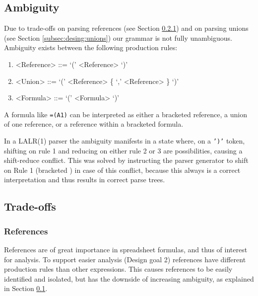 \documentclass[times]{smrauth}
\begin{document}
\subsection{Ambiguity}
\label{sec:ambiguity}

Due to trade-offs on parsing references (see Section \ref{tradeoff:references}) and on parsing unions (see Section \ref{subsec:desing:unions}) our grammar is not fully unambiguous.
Ambiguity exists between the following production rules:
\begin{enumerate}
	\item \begin{grammar}<Reference> ::= `(' <Reference> `)'\end{grammar}
	\item \begin{grammar}<Union> ::= `(' <Reference> \{ `,' <Reference> \} `)'\end{grammar}
	\item \begin{grammar}<Formula> ::= `(' <Formula> `)'\end{grammar}
\end{enumerate}

A formula like \texttt{=(A1)} can be interpreted as either a bracketed reference, a union of one reference, or a reference within a bracketed formula.

In a LALR(1) parser the ambiguity manifests in a state where, on a \texttt{')'} token, shifting on rule 1 and reducing on either rule 2 or 3 are possibilities, causing a shift-reduce conflict.
This was solved by instructing the parser generator to shift on Rule 1 (bracketed ) in case of this conflict, because this always is a correct interpretation and thus results in correct parse trees.

\subsection{Trade-offs}

\subsubsection{\textbf{References}}
\label{tradeoff:references}

References are of great importance in spreadsheet formulas, and thus of interest for analysis.
To support easier analysis (Design goal 2) references have different production rules than other expressions.
This causes references to be easily identified and isolated, but has the downside of increasing ambiguity, as explained in Section \ref{sec:ambiguity}. 
\end{document}
